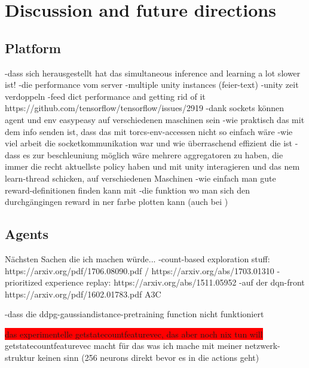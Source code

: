 

\chapter{Discussion and future directions}

\section{Platform}

-dass sich herausgestellt hat das simultaneous inference and learning a lot slower ist!
-die performance vom server
-multiple unity instances (feier-text)
-unity zeit verdoppeln
-feed dict performance and getting rid of it https://github.com/tensorflow/tensorflow/issues/2919
-dank sockets können agent und env easypeasy auf verschiedenen maschinen sein
-wie praktisch das mit dem info senden ist, dass das mit torcs-env-accessen nicht so einfach wäre
-wie viel arbeit die socketkommunikation war und wie überraschend effizient die ist
-dass es zur beschleuniung möglich wäre mehrere aggregatoren zu haben, die immer die recht aktuellste policy haben und mit unity interagieren und das nem learn-thread schicken, auf verschiedenen Maschinen
-wie einfach man gute reward-definitionen finden kann mit -die funktion wo man sich den durchgängingen reward in ner farbe plotten kann (auch bei )

\section{Agents}

Nächsten Sachen die ich machen würde...
-count-based exploration stuff: https://arxiv.org/pdf/1706.08090.pdf / https://arxiv.org/abs/1703.01310
-prioritized experience replay: https://arxiv.org/abs/1511.05952
-auf der dqn-front https://arxiv.org/pdf/1602.01783.pdf A3C

-dass die ddpg-gaussiandistance-pretraining function nicht funktioniert

\colorbox{red}{das experimentelle getstatecountfeaturevec, das aber noch nix tun will}
getstatecountfeaturevec macht für das was ich mache mit meiner netzwerk-struktur keinen sinn (256 neurons direkt bevor es in die actions geht)

